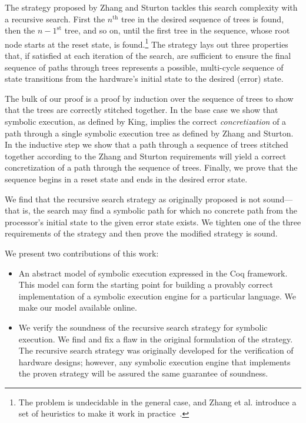 The strategy proposed by Zhang and Sturton tackles this search complexity with a
recursive search. First the $n^{\mathrm{th}}$ tree in the desired sequence of
trees is found, then the $n-1^{\mathrm{st}}$ tree, and so on, until the first
tree in the sequence, whose root node starts at the reset state, is
found.\footnote{The problem is undecidable in the general case, and Zhang et
  al. introduce a set of heuristics to make it work in
  practice~\cite{zhang2018end}.} The strategy lays out three properties that, if
satisfied at each iteration of the search, are sufficient to ensure the final
sequence of paths through trees represents a possible, multi-cycle sequence of
state transitions from the hardware's initial state to the desired (error)
state.

The bulk of our proof is a proof by induction over the sequence of trees to show
that the trees are correctly stitched together. In the base case we show that
symbolic
execution, as defined by King, implies the correct \emph{concretization} of a path through a
single symbolic execution tree as defined by Zhang and Sturton. In the inductive
step we show that a path through a sequence of trees stitched together according
to the Zhang and Sturton requirements will yield a correct concretization of a
path through the sequence of trees. Finally, we prove that the sequence begins in a reset state and ends in the
desired error state.

We find that the recursive search strategy as originally proposed is not sound---that is, the
search may find a symbolic path for which no concrete path from the processor's initial state
to the given error state exists. We tighten one of the three
requirements of the strategy and then prove the modified strategy is sound.

We present two contributions of this work:
\begin{itemize}
  \item An abstract model of symbolic execution expressed in the Coq
    framework. This model can form the starting point for 
    building a provably correct implementation of a symbolic execution engine for a
    particular language. We make our model available online.
\item We verify the soundness of the recursive search strategy for symbolic
  execution. We find and fix a flaw in the original formulation of the
  strategy. The recursive search strategy was originally developed for
  the verification of hardware designs; however, any symbolic execution engine that
  implements the proven strategy will be assured the same guarantee of soundness.
\end{itemize}
